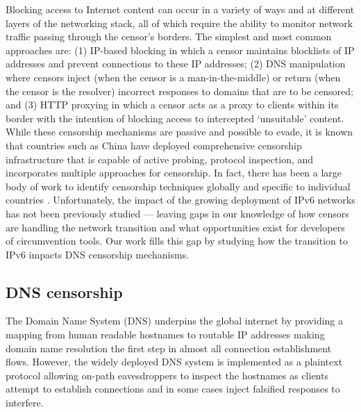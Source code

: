 %
Blocking access to Internet content can occur in a variety of ways and at
different layers of the networking stack, all of which require the ability to
monitor network traffic passing through the censor's borders. The simplest and
most common approaches are: (1) IP-based blocking in which a censor maintains
blocklists of IP addresses and prevent connections to these IP addresses; (2)
DNS manipulation where censors inject (when the censor is a man-in-the-middle)
or return (when the censor is the resolver) incorrect responses to domains that
are to be censored; and (3) HTTP proxying in which a censor acts as a proxy to
clients within its border with the intention of blocking access to intercepted
`unsuitable' content. 
%
While these censorship mechanisms are passive and possible to evade, it is
known that countries such as China have deployed comprehensive censorship
infrastructure that is capable of active probing, protocol inspection, and
incorporates multiple approaches for censorship.
%
In fact, there has been a large body of work to identify censorship techniques
globally
\cite{pearce2017global, niaki2020iclab, scott2016satellite,
sundara2020censored, filasto2012ooni, pearce2017augur, razaghpanah2016exploring}
and specific to individual countries \cite{USESEC21:GFWatch, aryan2013internet,
ramesh2020decentralized, yadav2018light, gebhart2017internet, nabi2013anatomy}.
%
Unfortunately, the impact of the growing deployment of IPv6 networks has not
been previously studied --- leaving gaps in our knowledge of how censors are
handling the network transition and what opportunities exist for developers of
circumvention tools. Our work fills this gap by studying how the transition to
IPv6 impacts DNS censorship mechanisms.

\subsection{DNS censorship}\label{sec:background:dns}


The Domain Name System (DNS) underpins the global internet by providing
a mapping from human readable hostnames to routable IP addresses making domain
name resolution the first step in almost all connection establishment flows.
However, the widely deployed DNS system is implemented as a plaintext protocol
allowing on-path eavesdroppers to inspect the hostnames as clients attempt to
establish connections and in some cases inject falsified responses to interfere.


